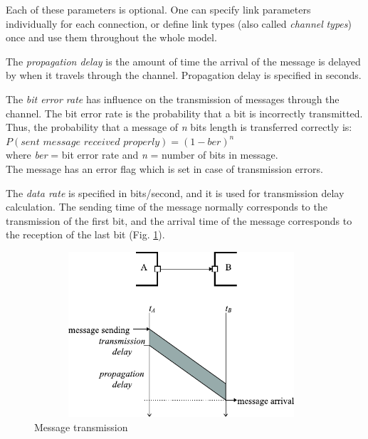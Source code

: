Each of these parameters is optional. One can specify link parameters 
individually for each connection, or define link types (also 
called \textit{channel} \textit{types}) once and use them throughout the 
whole model.

The \textit{propagation delay} is the amount of time the arrival of 
the message is delayed by when it travels through the channel. 
Propagation delay is specified in seconds.

The \textit{bit error rate} has influence on the transmission of messages 
through the channel. The bit error rate is the probability that 
a bit is incorrectly transmitted. Thus, the probability that 
a message of \textit{n} bits length is transferred correctly is:\\


$P( \textit{sent message received properly} ) = (1 - \textit{ber})^{\mathit{n}}$\\
where \textit{ber} = bit error rate and \textit{n} = number of bits in message.\\


The message has an error flag which is set in case of transmission 
errors.

The \textit{data rate} is specified in bits/second, and it is used 
for transmission delay calculation. The sending time of the message 
normally corresponds to the transmission of the first bit, and 
the arrival time of the message corresponds to the reception 
of the last bit (Fig. \ref{fig:ch-overview:message-transm}).

\begin{figure}[htbp]
\begin{center}
\includegraphics[width=4.301in, height=2.417in]{figures/usmanFig4}
\caption{Message transmission}
\label{fig:ch-overview:message-transm}
\end{center}
\end{figure}

